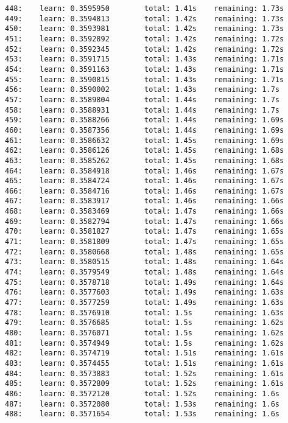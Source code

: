 \documentclass[11pt]{article}
\begin{document}
\begin{Verbatim}[commandchars=\\\{\}]
448:    learn: 0.3595950        total: 1.41s    remaining: 1.73s
449:    learn: 0.3594813        total: 1.42s    remaining: 1.73s
450:    learn: 0.3593981        total: 1.42s    remaining: 1.73s
451:    learn: 0.3592892        total: 1.42s    remaining: 1.72s
452:    learn: 0.3592345        total: 1.42s    remaining: 1.72s
453:    learn: 0.3591715        total: 1.43s    remaining: 1.71s
454:    learn: 0.3591163        total: 1.43s    remaining: 1.71s
455:    learn: 0.3590815        total: 1.43s    remaining: 1.71s
456:    learn: 0.3590002        total: 1.43s    remaining: 1.7s
457:    learn: 0.3589804        total: 1.44s    remaining: 1.7s
458:    learn: 0.3588931        total: 1.44s    remaining: 1.7s
459:    learn: 0.3588266        total: 1.44s    remaining: 1.69s
460:    learn: 0.3587356        total: 1.44s    remaining: 1.69s
461:    learn: 0.3586632        total: 1.45s    remaining: 1.69s
462:    learn: 0.3586126        total: 1.45s    remaining: 1.68s
463:    learn: 0.3585262        total: 1.45s    remaining: 1.68s
464:    learn: 0.3584918        total: 1.46s    remaining: 1.67s
465:    learn: 0.3584724        total: 1.46s    remaining: 1.67s
466:    learn: 0.3584716        total: 1.46s    remaining: 1.67s
467:    learn: 0.3583917        total: 1.46s    remaining: 1.66s
468:    learn: 0.3583469        total: 1.47s    remaining: 1.66s
469:    learn: 0.3582794        total: 1.47s    remaining: 1.66s
470:    learn: 0.3581827        total: 1.47s    remaining: 1.65s
471:    learn: 0.3581809        total: 1.47s    remaining: 1.65s
472:    learn: 0.3580668        total: 1.48s    remaining: 1.65s
473:    learn: 0.3580515        total: 1.48s    remaining: 1.64s
474:    learn: 0.3579549        total: 1.48s    remaining: 1.64s
475:    learn: 0.3578718        total: 1.49s    remaining: 1.64s
476:    learn: 0.3577603        total: 1.49s    remaining: 1.63s
477:    learn: 0.3577259        total: 1.49s    remaining: 1.63s
478:    learn: 0.3576910        total: 1.5s     remaining: 1.63s
479:    learn: 0.3576685        total: 1.5s     remaining: 1.62s
480:    learn: 0.3576071        total: 1.5s     remaining: 1.62s
481:    learn: 0.3574949        total: 1.5s     remaining: 1.62s
482:    learn: 0.3574719        total: 1.51s    remaining: 1.61s
483:    learn: 0.3574455        total: 1.51s    remaining: 1.61s
484:    learn: 0.3573883        total: 1.52s    remaining: 1.61s
485:    learn: 0.3572809        total: 1.52s    remaining: 1.61s
486:    learn: 0.3572120        total: 1.52s    remaining: 1.6s
487:    learn: 0.3572080        total: 1.53s    remaining: 1.6s
488:    learn: 0.3571654        total: 1.53s    remaining: 1.6s

\end{Verbatim}
\end{document}
